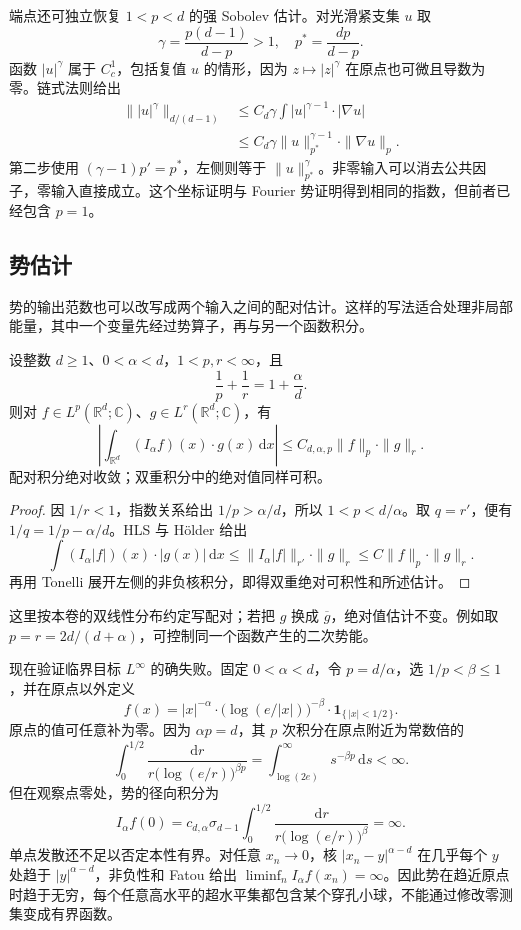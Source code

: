 \ProseParagraphBreak

端点还可独立恢复 \(1<p<d\) 的强 Sobolev 估计。对光滑紧支集 \(u\) 取
\[
 \gamma=\frac{p(d-1)}{d-p}>1,
 \quad p^*=\frac{dp}{d-p}.
\]
函数 \(|u|^\gamma\) 属于 \(C_c^1\)，包括复值 \(u\) 的情形，因为 \(z\mapsto|z|^\gamma\) 在原点也可微且导数为零。链式法则给出
\[
 \begin{aligned}
 \bigl\||u|^\gamma\bigr\|_{d/(d-1)}
 &\leq C_d\gamma\int |u|^{\gamma-1}\cdot|\nabla u|\\
 &\leq C_d\gamma\|u\|_{p^*}^{\gamma-1}\cdot\|\nabla u\|_p.
 \end{aligned}
\]
第二步使用 \((\gamma-1)p'=p^*\)，左侧则等于 \(\|u\|_{p^*}^\gamma\)。非零输入可以消去公共因子，零输入直接成立。这个坐标证明与 Fourier 势证明得到相同的指数，但前者已经包含 \(p=1\)。

\subsection{势估计}
\label{b2:subsec:190203}

势的输出范数也可以改写成两个输入之间的配对估计。这样的写法适合处理非局部能量，其中一个变量先经过势算子，再与另一个函数积分。
\begin{corollary}\label{b2:cor:19-hls-bilinear}
设整数 \(d\geq1\)、\(0<\alpha<d\)，\(1<p,r<\infty\)，且
\[
 \frac1p+\frac1r=1+\frac\alpha d.
\]
则对 \(f\in L^p(\mathbb R^d;\mathbb C)\)、\(g\in L^r(\mathbb R^d;\mathbb C)\)，有
\[
 \left|\int_{\mathbb R^d}(I_\alpha f)(x)\cdot g(x)\,\mathrm dx\right|
 \leq C_{d,\alpha,p}\|f\|_p\cdot\|g\|_r.
\]
配对积分绝对收敛；双重积分中的绝对值同样可积。
\end{corollary}
\begin{proof}
因 \(1/r<1\)，指数关系给出 \(1/p>\alpha/d\)，所以 \(1<p<d/\alpha\)。取 \(q=r'\)，便有 \(1/q=1/p-\alpha/d\)。HLS 与 Hölder 给出
\[
 \int(I_\alpha|f|)(x)\cdot|g(x)|\,\mathrm dx
 \leq\|I_\alpha|f|\|_{r'}\cdot\|g\|_r
 \leq C\|f\|_p\cdot\|g\|_r.
\]
再用 Tonelli 展开左侧的非负核积分，即得双重绝对可积性和所述估计。
\end{proof}
这里按本卷的双线性分布约定写配对；若把 \(g\) 换成 \(\overline g\)，绝对值估计不变。例如取 \(p=r=2d/(d+\alpha)\)，可控制同一个函数产生的二次势能。

\ProseParagraphBreak

现在验证临界目标 \(L^\infty\) 的确失败。固定 \(0<\alpha<d\)，令 \(p=d/\alpha\)，选 \(1/p<\beta\leq1\)，并在原点以外定义
\[
 f(x)=|x|^{-\alpha}\cdot
       \bigl(\log(e/|x|)\bigr)^{-\beta}
       \cdot\mathbf1_{\{\,|x|<1/2\,\}}.
\]
原点的值可任意补为零。因为 \(\alpha p=d\)，其 \(p\) 次积分在原点附近为常数倍的
\[
 \int_0^{1/2}\frac{\mathrm dr}{r\bigl(\log(e/r)\bigr)^{\beta p}}
 =\int_{\log(2e)}^\infty s^{-\beta p}\,\mathrm ds<\infty.
\]
但在观察点零处，势的径向积分为
\[
 I_\alpha f(0)
 =c_{d,\alpha}\sigma_{d-1}
   \int_0^{1/2}\frac{\mathrm dr}{r\bigl(\log(e/r)\bigr)^\beta}
 =\infty.
\]
单点发散还不足以否定本性有界。对任意 \(x_n\to0\)，核 \(|x_n-y|^{\alpha-d}\) 在几乎每个 \(y\) 处趋于 \(|y|^{\alpha-d}\)，非负性和 Fatou 给出 \(\liminf_nI_\alpha f(x_n)=\infty\)。因此势在趋近原点时趋于无穷，每个任意高水平的超水平集都包含某个穿孔小球，不能通过修改零测集变成有界函数。

